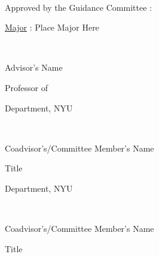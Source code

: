 \mbox{} \\
{\large
Approved by the Guidance Committee :

\vspace{.1 in}

\hspace{.1 in} \underline{Major} : Place Major Here

\vspace{.3 in}


\hspace{1.5 in} \hrulefill\

\vspace{-.2 in}

\hspace{1.5 in} Advisor's Name

\vspace{-.1 in}

\hspace{1.5 in} Professor of

\vspace{-.2 in}

\hspace{1.5 in} Department, NYU 

\vspace{.5 in}


\hspace{1.5 in} \hrulefill\

\vspace{-.2 in}

\hspace{1.5 in} Coadvisor's/Committee Member's Name
\vspace{-.1 in}

\hspace{1.5 in} Title

\vspace{-.2 in}

\hspace{1.5 in} Department, NYU

\vspace{.5 in}


\hspace{1.5 in} \hrulefill\

\vspace{-.2 in}

\hspace{1.5 in} Coadvisor's/Committee Member's Name
\vspace{-.1 in}

\hspace{1.5 in} Title

}
